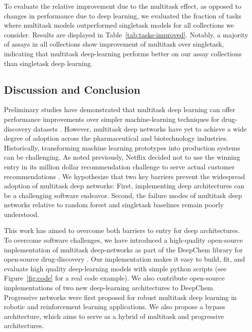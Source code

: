 To evaluate the relative improvement due to the multitask effect, as opposed to changes in performance due to deep learning, we evaluated the fraction of tasks where multitask models outperformed singletask models for all collections we consider. Results are displayed in Table~\ref{tab:tasks-improved}. Notably, a majority of assays in all collections show improvement of multitask over singletask, indicating that multitask deep-learning performs better on our assay collections than singletask deep learning.

\subsection{Discussion and Conclusion}

Preliminary studies have demonstrated that multitask deep learning can offer performance improvements over simpler machine-learning techniques for drug-discovery datasets \cite{ma2015deep, ramsundar2015massively}. However, multitask deep networks have yet to achieve a wide degree of adoption across the pharmaceutical and biotechnology industries. Historically, transforming machine learning prototypes into production systems can be challenging. As noted previously, Netflix decided not to use the winning entry in its million dollar recommendation challenge to serve actual customer recommendations \cite{netflixNever}. We hypothesize that two key barriers prevent the widespread adoption of multitask deep networks: First, implementing deep architectures can be a challenging software endeavor. Second, the failure modes of multitask deep networks relative to random forest and singletask baselines remain poorly understood.

This work has aimed to overcome both barriers to entry for deep architectures. To overcome software challenges, we have introduced a high-quality open-source implementation of multitask deep-networks as part of the DeepChem library for open-source drug-discovery \cite{deepchem}. Our implementation makes it easy to build, fit, and evaluate high quality deep-learning models with simple python scripts (see Figure~\ref{fig:code} for a real code example). We also contribute open-source implementations of two new deep-learning architectures to DeepChem. Progressive networks \cite{rusu2016progressive} were first proposed for robust multitask deep learning in robotic and reinforcement learning applications. We also propose a bypass architecture, which aims to serve as a hybrid of multitask and progressive architectures. 

